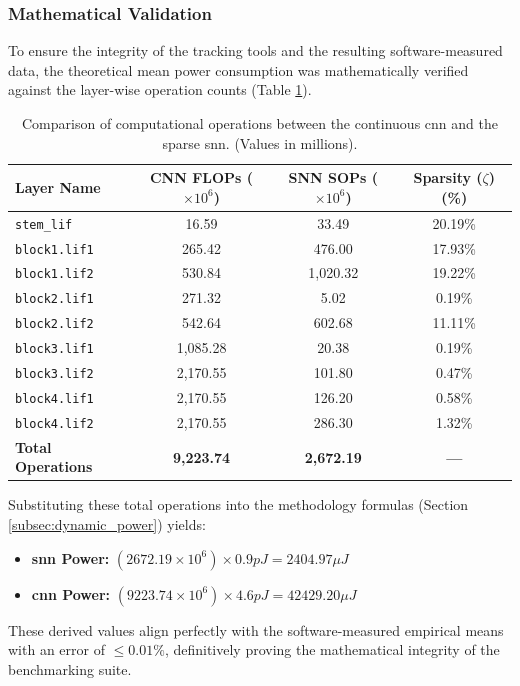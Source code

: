\clearpage

\subsubsection*{Mathematical Validation}

To ensure the integrity of the tracking tools and the resulting software-measured data, the theoretical mean power consumption was mathematically verified against the layer-wise operation counts (Table \ref{tab:layer_ops}).

\begin{table}[htbp]
\centering
\begin{tabular}{|l|c|c|c|}
\hline
\textbf{Layer Name} & \textbf{CNN FLOPs ($\times 10^6$)} & \textbf{SNN SOPs ($\times 10^6$)} & \textbf{Sparsity ($\zeta$) (\%)} \\
\hline
\texttt{stem\_lif} & 16.59 & 33.49 & 20.19\% \\
\texttt{block1.lif1} & 265.42 & 476.00 & 17.93\% \\
\texttt{block1.lif2} & 530.84 & 1,020.32 & 19.22\% \\
\texttt{block2.lif1} & 271.32 & 5.02 & 0.19\% \\
\texttt{block2.lif2} & 542.64 & 602.68 & 11.11\% \\
\texttt{block3.lif1} & 1,085.28 & 20.38 & 0.19\% \\
\texttt{block3.lif2} & 2,170.55 & 101.80 & 0.47\% \\
\texttt{block4.lif1} & 2,170.55 & 126.20 & 0.58\% \\
\texttt{block4.lif2} & 2,170.55 & 286.30 & 1.32\% \\
\hline
\textbf{Total Operations} & \textbf{9,223.74} & \textbf{2,672.19} & \textbf{---} \\
\hline
\end{tabular}
\caption[Layer-Wise Operations Comparison]{Comparison of computational operations between the continuous \gls{cnn} and the sparse \gls{snn}. (Values in millions).}
\label{tab:layer_ops}
\end{table}

Substituting these total operations into the methodology formulas (Section \ref{subsec:dynamic_power}) yields:

\begin{itemize}
    \item \textbf{\gls{snn} Power:} $(2672.19\times 10^6) \times 0.9pJ = 2404.97 \mu J$
    \item \textbf{\gls{cnn} Power:} $(9223.74 \times 10^6) \times 4.6pJ = 42429.20 \mu J$
\end{itemize}

These derived values align perfectly with the software-measured empirical means with an error of $\le 0.01\%$,
definitively proving the mathematical integrity of the benchmarking suite.
